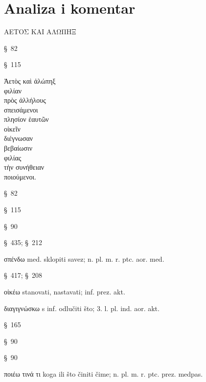\section*{Analiza i komentar}


{\large
\begin{greek}
\noindent ΑΕΤΟΣ ΚΑΙ ΑΛΩΠΗΞ

\end{greek}
}

\begin{description}[noitemsep]
\item[ΑΕΤΟΣ] §~82
\item[ΑΛΩΠΗΞ] §~115

\end{description}

{\large
\begin{greek}
\noindent Ἀετὸς καὶ ἀλώπηξ \\
\tabto{2em} φιλίαν \\
\tabto{3em} πρὸς ἀλλήλους \\
\tabto{2em} σπεισάμενοι \\
πλησίον ἑαυτῶν \\
\tabto{2em} οἰκεῖν \\
διέγνωσαν \\
\tabto{2em} βεβαίωσιν \\
\tabto{4em} φιλίας \\
\tabto{2em} τὴν συνήθειαν \\
\tabto{3em} ποιούμενοι.\\

\end{greek}
}

\begin{description}[noitemsep]
\item[Ἀετὸς] §~82
\item[ἀλώπηξ ] §~115
\item[φιλίαν ] §~90
\item[πρὸς ἀλλήλους ] §~435; §~212
\item[σπεισάμενοι ] σπένδω med. sklopiti savez; n. pl. m. r. ptc. aor. med.
\item[πλησίον ἑαυτῶν ] §~417; §~208
\item[οἰκεῖν ] οἰκέω stanovati, nastavati; inf. prez. akt.
\item[διέγνωσαν ] διαγιγνώσκω s inf. odlučiti što; 3. l. pl. ind. aor. akt.
\item[βεβαίωσιν ] §~165
\item[φιλίας ] §~90
\item[τὴν συνήθειαν ] §~90
\item[ποιούμενοι] ποιέω τινά τι koga ili što činiti čime; n. pl. m. r. ptc. prez. medpas.

\end{description}


